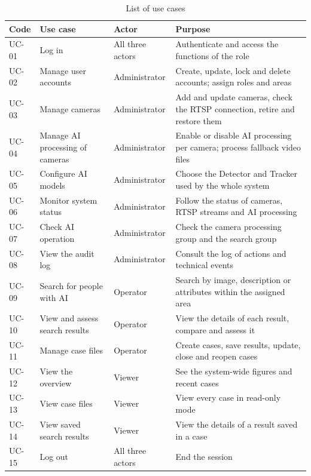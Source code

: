 \begin{table}[H]
\centering
\caption{List of use cases}
\label{tab:usecases}
\begin{tabularx}{\textwidth}{|>{\raggedright\arraybackslash}p{1.4cm}|>{\raggedright\arraybackslash}p{3.8cm}|>{\raggedright\arraybackslash}p{2.75cm}|L|}
\hline
\textbf{Code} & \textbf{Use case} & \textbf{Actor} & \textbf{Purpose} \\
\hline
UC-01 & Log in & All three actors & Authenticate and access the functions of the role \\
\hline
UC-02 & Manage user accounts & Administrator & Create, update, lock and delete accounts; assign roles and areas \\
\hline
UC-03 & Manage cameras & Administrator & Add and update cameras, check the RTSP connection, retire and restore them \\
\hline
UC-04 & Manage AI processing of cameras & Administrator & Enable or disable AI processing per camera; process fallback video files \\
\hline
UC-05 & Configure AI models & Administrator & Choose the Detector and Tracker used by the whole system \\
\hline
UC-06 & Monitor system status & Administrator & Follow the status of cameras, RTSP streams and AI processing \\
\hline
UC-07 & Check AI operation & Administrator & Check the camera processing group and the search group \\
\hline
UC-08 & View the audit log & Administrator & Consult the log of actions and technical events \\
\hline
UC-09 & Search for people with AI & Operator & Search by image, description or attributes within the assigned area \\
\hline
UC-10 & View and assess search results & Operator & View the details of each result, compare and assess it \\
\hline
UC-11 & Manage case files & Operator & Create cases, save results, update, close and reopen cases \\
\hline
UC-12 & View the overview & Viewer & See the system-wide figures and recent cases \\
\hline
UC-13 & View case files & Viewer & View every case in read-only mode \\
\hline
UC-14 & View saved search results & Viewer & View the details of a result saved in a case \\
\hline
UC-15 & Log out & All three actors & End the session \\
\hline
\end{tabularx}
\end{table}
